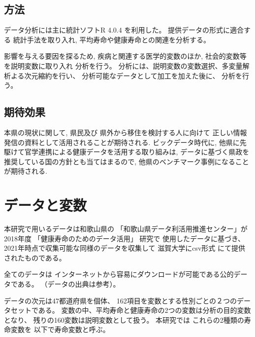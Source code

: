 \section{方法}
データ分析には主に統計ソフトR 4.0.4
を利用した。
提供データの形式に適合する
統計手法を取り入れ,
平均寿命や健康寿命との関連を分析する。

影響を与える要因を探るため,
疾病と関連する医学的変数のほか, 社会的変数等を説明変数に取り入れ
分析を行う。
分析には、説明変数の変数選択、多変量解析よる次元縮約を行い、
分析可能なデータとして加工を加えた後に、
分析を行う。




\section{期待効果}

本県の現状に関して,
県民及び
県外から移住を検討する人に向けて
正しい情報発信の資料として活用されることが期待される.
ビックデータ時代に, 他県に先駆けて官学連携による健康データを活用する取り組みは, データに基づく県政を推奨している国の方針とも当てはまるので, 他県のベンチマーク事例になることが期待される.




\chapter{データと変数}\label{chapter:data}

本研究で用いるデータは和歌山県の
「和歌山県データ利活用推進センター」が
2018年度
「健康寿命のためのデータ活用」
研究で
使用したデータに基づき、
2021年時点で収集可能な同様のデータを収集して
滋賀大学にcsv形式
にて提供されたものである。


全てのデータは
インターネットから容易にダウンロードが可能である公的データである。
（データの出典は参考）。



データの次元は47都道府県を個体、
162項目を変数とする性別ごとの２つのデータセットである。
変数の中、平均寿命と健康寿命の2つの変数は分析の目的変数となり、
残りの160変数は説明変数として扱う。
本研究では
これらの2種類の寿命変数を
以下で寿命変数と呼ぶ。

